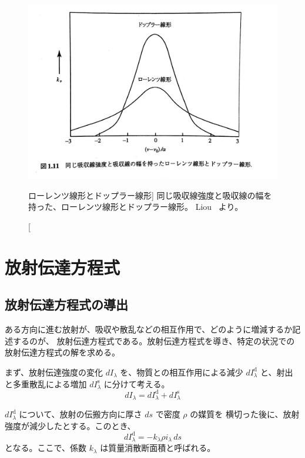 \documentclass[book]{dennou777}
\begin{document}
\begin{figure}[t]
	\includegraphics[width=\textwidth]{lorentz.jpg}
	\caption
	[ローレンツ線形とドップラー線形]
	{
		同じ吸収線強度と吸収線の幅を持った、ローレンツ線形とドップラー線形。
		Liou~\cite{liou} より。
	}
\end{figure}

\chapter{放射伝達方程式}

\section{放射伝達方程式の導出}
ある方向に進む放射が、吸収や散乱などの相互作用で、どのように増減するか記述するのが、
放射伝達方程式である。放射伝達方程式を導き、特定の状況での放射伝達方程式の解を求める。

まず、放射伝達強度の変化 \(dI_\lambda\) を、物質との相互作用による減少
\(dI_\lambda^\mathrm{d}\) と、射出と多重散乱による増加 \(dI_\lambda^\mathrm{s}\) に分けて考える。
\begin{equation}
	dI_\lambda=dI_\lambda^\mathrm{d}+dI_\lambda^\mathrm{s}
\end{equation}

\(dI_\lambda^\mathrm{d}\) について、放射の伝搬方向に厚さ \(ds\) で密度 \(\rho\) の媒質を
横切った後に、放射強度が減少したとする。このとき、
\begin{equation}
	dI_\lambda^\mathrm{d}=-k_\lambda\rho i_\lambda\,ds
\end{equation}
となる。ここで、係数 \(k_\lambda\) は質量消散断面積と呼ばれる。
\end{document}
